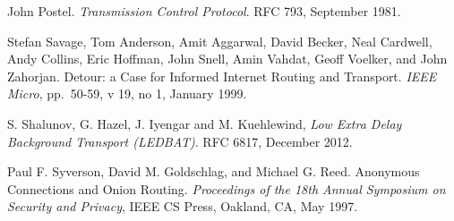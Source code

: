 \documentclass[conference,letterpaper]{IEEEtran}
\begin{document}
\begin{thebibliography}{99}
 John Postel.  \emph{Transmission Control Protocol}.
  RFC 793, September 1981.

\newpage

 Stefan Savage, Tom Anderson, Amit Aggarwal, David
  Becker, Neal Cardwell, Andy Collins, Eric Hoffman, John Snell, Amin
  Vahdat, Geoff Voelker, and John Zahorjan.  Detour: a Case for
  Informed Internet Routing and Transport.  \emph{IEEE Micro},
  pp.\ 50-59, v 19, no 1, January 1999.

  S. Shalunov, G. Hazel, J. Iyengar and M. Kuehlewind,
  \emph{Low Extra Delay Background Transport (LEDBAT)}.
  RFC 6817,
  December 2012.

 Paul F. Syverson, David M. Goldschlag, and Michael
  G. Reed.  Anonymous Connections and Onion Routing.
  \emph{Proceedings of the 18th Annual Symposium on Security and
    Privacy}, IEEE CS Press, Oakland, CA, May 1997.

\end{thebibliography}
\end{document}
